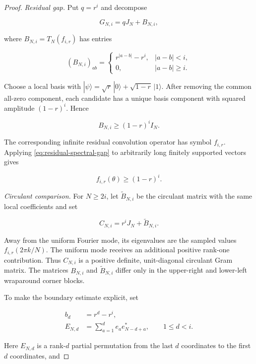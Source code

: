 \begin{proof}
\emph{Residual gap.}
Put \(q=r^i\) and decompose

\[
G_{N,i}=qJ_N+B_{N,i},
\]

where \(B_{N,i}=T_N(f_{i,r})\) has entries

\[
(B_{N,i})_{ab}=
\begin{cases}
r^{|a-b|}-r^i,&|a-b|<i,\\
0,&|a-b|\ge i.
\end{cases}
\]

Choose a local basis with
\(|\psi\rangle=\sqrt r\,|0\rangle+\sqrt{1-r}\,|1\rangle\). After removing the
common all-zero component, each candidate has a unique basis component with
squared amplitude \((1-r)^i\). Hence

\begin{equation}\label{eq:residual-spectral-gap}
B_{N,i}\ge(1-r)^iI_N.
\end{equation}

The corresponding infinite residual convolution operator has symbol
\(f_{i,r}\). Applying \eqref{eq:residual-spectral-gap} to arbitrarily long
finitely supported vectors gives

\begin{equation}\label{eq:symbol-spectral-gap}
f_{i,r}(\theta)\ge(1-r)^i.
\end{equation}

\emph{Circulant comparison.}
For \(N\ge2i\), let \(\widetilde B_{N,i}\) be the circulant matrix with the same local coefficients and set

\[
C_{N,i}=r^iJ_N+\widetilde B_{N,i}.
\]

Away from the uniform Fourier mode, its eigenvalues are the sampled values
\(f_{i,r}(2\pi k/N)\). The uniform mode receives an additional positive
rank-one contribution. Thus \(C_{N,i}\) is a positive definite, unit-diagonal
circulant Gram matrix. The matrices \(B_{N,i}\) and \(\widetilde B_{N,i}\)
differ only in the upper-right and lower-left wraparound corner blocks.

To make the boundary estimate explicit, set

\begin{align*}
b_d&=r^d-r^i,\\
E_{N,d}&=\sum_{a=1}^{d}e_a e_{N-d+a}^*,
\qquad 1\le d<i.
\end{align*}

Here \(E_{N,d}\) is a rank-\(d\) partial permutation from the last \(d\)
coordinates to the first \(d\) coordinates, and


\end{proof}
